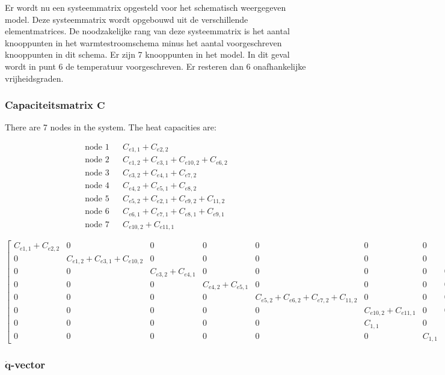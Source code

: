 Er wordt nu een systeemmatrix opgesteld voor het schematisch weergegeven model. Deze
systeemmatrix wordt opgebouwd uit de verschillende elementmatrices. De noodzakelijke rang van
deze systeemmatrix is het aantal knooppunten in het warmtestroomschema minus het aantal
voorgeschreven knooppunten in dit schema. Er zijn 7 knooppunten in het model. In dit geval wordt
in punt 6 de temperatuur voorgeschreven.
Er resteren dan 6 onafhankelijke vrijheidsgraden.

\subsubsection{Capaciteitsmatrix $\mathbf{C}$}

There are 7 nodes in the system. The heat capacities are:

\begin{equation}
	\begin{aligned}
\text{node 1} & & C_{e1,1} + C_{e2,2} \\
\text{node 2} & & C_{e1,2} + C_{e3,1} + C_{e10,2} + C_{e6,2} \\
\text{node 3} & & C_{e3,2} + C_{e4,1} + C_{e7,2} \\
\text{node 4} & & C_{e4,2} + C_{e5, 1} + C_{e8,2} \\
\text{node 5} & & C_{e5,2} + C_{e2, 1} + C_{e9, 2} + C_{11,2} \\
\text{node 6} & & C_{e6,1} + C_{e7, 1} +  C_{e8, 1} +  C_{e9, 1} \\
\text{node 7} & & C_{e10,2} + C_{e11,1}
	\end{aligned}
\end{equation}

\[
\begin{bmatrix}
	C_{e1,1} + C_{e2,2} & 0 & 0 & 0 & 0 & 0 & 0 \\
	0 & C_{e1,2} + C_{e3,1} + C_{e10,2} & 0 & 0 & 0 & 0 & 0 \\
	0 & 0 & C_{e3,2} + C_{e4,1} & 0 & 0 & 0 & 0 & 0 \\
	0 & 0 & 0 & C_{e4,2} + C_{e5, 1} & 0 & 0 & 0 & 0 \\
	0 & 0 & 0 & 0 & C_{e5,2} + C_{e6, 2} + C_{e7, 2} + C_{11,2} & 0 & 0 & 0 \\
	0 & 0 & 0 & 0 & 0 & C_{e10,2} + C_{e11, 1} & 0 & 0 \\
	0 & 0 & 0 & 0 & 0 & C_{1,1} & 0 \\
	0 & 0 & 0 & 0 & 0 & 0 & C_{1,1}
\end{bmatrix}
\]

\subsubsection{$\mathbf{\dot{q}}$-vector}

